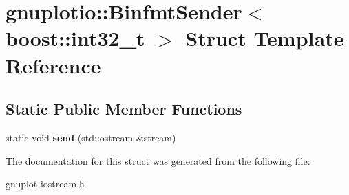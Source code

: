 \hypertarget{structgnuplotio_1_1BinfmtSender_3_01boost_1_1int32__t_01_4}{}\section{gnuplotio\+:\+:Binfmt\+Sender$<$ boost\+:\+:int32\+\_\+t $>$ Struct Template Reference}
\label{structgnuplotio_1_1BinfmtSender_3_01boost_1_1int32__t_01_4}
\subsection*{Static Public Member Functions}
\begin{DoxyCompactItemize}
\item 
\mbox{\label{structgnuplotio_1_1BinfmtSender_3_01boost_1_1int32__t_01_4_a44f75b80ef3f5def62eaa2093810fd35}} 
static void {\bfseries send} (std\+::ostream \&stream)
\end{DoxyCompactItemize}


The documentation for this struct was generated from the following file\+:\begin{DoxyCompactItemize}
\item 
gnuplot-\/iostream.\+h\end{DoxyCompactItemize}
